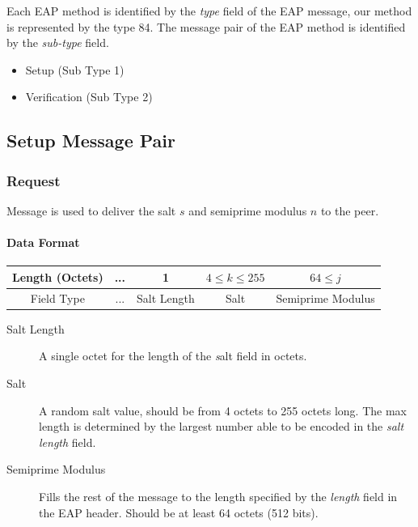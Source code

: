 Each EAP method is identified by the \textit{type} field of the EAP message, our method is represented by the type 84.
The message pair of the EAP method is identified by the \textit{sub-type} field.
\medskip
\begin{itemize}
	\item Setup (Sub Type 1)
	\item Verification (Sub Type 2)
\end{itemize}

\subsection{Setup Message Pair}

%

\subsubsection{Request} Message is used to deliver the salt $s$ and semiprime modulus $n$ to the peer.

\paragraph{Data Format}

\begin{center}
\begin{tabular}{|c|c|c|c|c|}
	\hline
	Length (Octets) & ... & 1 & $4 \le k \le 255 $ & $64 \le j$\\
	\hline
	Field Type & ... & Salt Length & Salt & Semiprime Modulus\\
	\hline
\end{tabular}
\end{center}

\begin{description}
	\item[Salt Length] A single octet for the length of the \textit salt field in octets.
	\item[Salt] A random salt value, should be from 4 octets to 255 octets long.
The max length is determined by the largest number able to be encoded in the \textit {salt length} field.
	\item[Semiprime Modulus] Fills the rest of the message to the length specified by the \textit{length} field in the EAP header. 
Should be at least 64 octets (512 bits).
\end{description}

